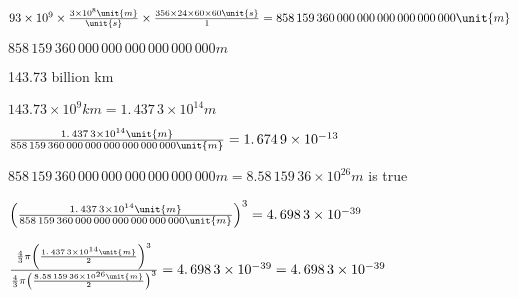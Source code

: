 \documentclass{article}
\begin{document}
$93\times 10^{9}\times \frac{3\times 10^{8}\unit{m}}{\unit{s}}\times \frac{%
356\times 24\times 60\times 60\unit{s}}{1}=\allowbreak
858\,159\,360\,\allowbreak 000\,000\,000\,\allowbreak 000\,000\,000\unit{m}$

$858\,159\,360\,\allowbreak 000\,000\,000\,\allowbreak 000\,000\,000\unit{m}$

143.73 billion km

$143.73\times 10^{9}\unit{km}=\allowbreak 1.\,\allowbreak 437\,3\times
10^{14}\unit{m}$

$\frac{\allowbreak 1.\,\allowbreak 437\,3\times 10^{14}\unit{m}}{%
858\,159\,360\,\allowbreak 000\,000\,000\,\allowbreak 000\,000\,000\unit{m}}%
=\allowbreak 1.\,\allowbreak 674\,9\times 10^{-13}$

$858\,159\,360\,000\,000\,000\,000\,000\,000\unit{m}=8.58\,159\,36\times
10^{26}\unit{m}$ is true

$\left( \frac{\allowbreak 1.\,\allowbreak 437\,3\times 10^{14}\unit{m}}{%
858\,159\,360\,\allowbreak 000\,000\,000\,\allowbreak 000\,000\,000\unit{m}}%
\right) ^{3}=\allowbreak 4.\,\allowbreak 698\,3\times 10^{-39}$

\bigskip 

$\frac{\frac{4}{3}\pi \left( \allowbreak \frac{1.\,\allowbreak 437\,3\times
10^{14}\unit{m}}{2}\right) ^{3}}{\frac{4}{3}\pi \left( \frac{%
8.58\,159\,36\times 10^{26}\unit{m}}{2}\right) ^{3}}=\allowbreak
4.\,\allowbreak 698\,3\times 10^{-39}=\allowbreak 4.\,\allowbreak
698\,3\times 10^{-39}$
\end{document}
